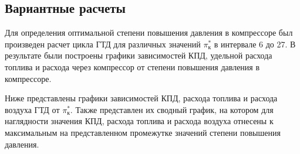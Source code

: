 \documentclass[a4paper,10pt]{article}
\begin{document}
\subsection{Вариантные расчеты}
Для определения оптимальной степени повышения давления в компрессоре был произведен расчет цикла ГТД для различных значений  $\pi_к^*$ в интервале 6 до 27. В результате были построены графики зависимостей КПД, удельной расхода топлива и расхода через компрессор от степени повышения давления в компрессоре.

Ниже представлены графики зависимостей КПД, расхода топлива и расхода воздуха ГТД от $\pi_к^*$. Также представлен их сводный график, на котором для наглядности значения КПД, расхода топлива и расхода воздуха отнесены к максимальным на представленном промежутке значений степени повышения давления.
\end{document}
